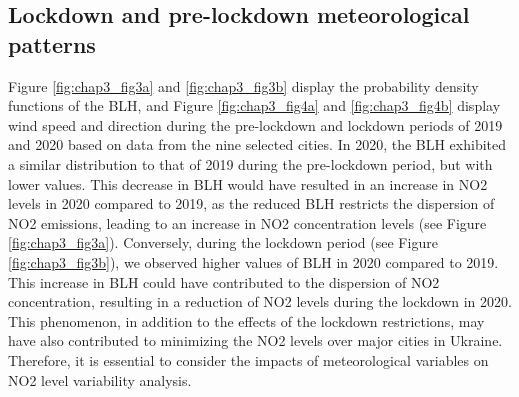 \subsection{Lockdown and pre-lockdown meteorological patterns}
Figure \ref{fig:chap3_fig3a} and \ref{fig:chap3_fig3b} display the probability density functions of the BLH, and Figure \ref{fig:chap3_fig4a} and \ref{fig:chap3_fig4b} display wind speed and direction during the pre-lockdown and lockdown periods of 2019 and 2020 based on data from the nine selected cities. In 2020, the BLH exhibited a similar distribution to that of 2019 during the pre-lockdown period, but with lower values. This decrease in BLH would have resulted in an increase in NO2 levels in 2020 compared to 2019, as the reduced BLH restricts the dispersion of NO2 emissions, leading to an increase in NO2 concentration levels (see Figure \ref{fig:chap3_fig3a}). Conversely, during the lockdown period (see Figure \ref{fig:chap3_fig3b}), we observed higher values of BLH in 2020 compared to 2019. This increase in BLH could have contributed to the dispersion of NO2 concentration, resulting in a reduction of NO2 levels during the lockdown in 2020. This phenomenon, in addition to the effects of the lockdown restrictions, may have also contributed to minimizing the NO2 levels over major cities in Ukraine. Therefore, it is essential to consider the impacts of meteorological variables on NO2 level variability analysis.\par


